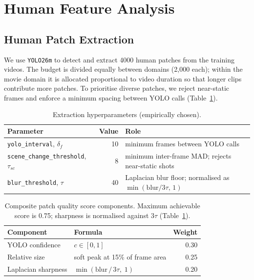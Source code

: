 \section{Human Feature Analysis}\label{s:hfa}


\subsection{Human Patch Extraction}

We use \texttt{YOLO26m} \cite{yolo26_ultralytics} to detect and extract 4000 human patches from the training videos.
The budget is divided equally between domains (2,000 each); within the movie domain it is allocated proportional to video duration so that longer clips contribute more patches. 
To prioritise diverse patches, we reject near-static frames and enforce a minimum spacing between YOLO calls (Table~\ref{tab:extract_params}).

\begin{table}[h]
  \centering
  \caption{Extraction hyperparameters (empirically chosen).}
  \label{tab:extract_params}
  \begin{tabular}{lrp{6cm}}
    \toprule
    Parameter & Value & Role \\
    \midrule
    \texttt{yolo\_interval}, $\delta_f$            & 10 & minimum frames between YOLO calls \\
    \texttt{scene\_change\_threshold}, $\tau_{sc}$ & 8         & minimum inter-frame MAD; rejects near-static shots \\
    \texttt{blur\_threshold}, $\tau$               & 40        & Laplacian blur floor; normalised as $\min(\text{blur}/3\tau,\,1)$ \\
    \bottomrule
  \end{tabular}
\end{table}

\begin{table}[h]
  \centering
  \caption{Composite patch quality score components. Maximum achievable score is 0.75; sharpness is normalised against $3\tau$ (Table~\ref{tab:extract_params}).}
  \label{tab:score_weights}
  \begin{tabular}{llr}
    \toprule
    Component & Formula & Weight \\
    \midrule
    YOLO confidence & $c \in [0,1]$ & 0.30 \\
    Relative size & soft peak at 15\% of frame area & 0.25 \\
    Laplacian sharpness & $\min(\text{blur}\,/\,3\tau,\;1)$ & 0.20 \\
    \bottomrule
  \end{tabular}
\end{table}

